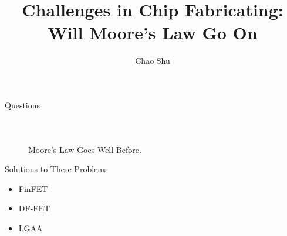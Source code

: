 \documentclass[14pt,xcolor=dvipsnames]{beamer}
\title{Challenges in Chip Fabricating:\\
	 Will Moore's Law Go On}
\author{Chao Shu\\}
\date{}
\begin{document}
\begin{frame}
\titlepage
\end{frame}

\begin{frame}{Questions}
\\
\end{frame}

\begin{frame}
\begin{columns}
	\begin{figure}[h!]
		\centering
	\end{figure}
    \pause
	\begin{figure}[h!]
		\centering
	\end{figure}
\end{columns}
\end{frame}

\begin{frame}
	\begin{figure}[h!]
	\centering
	\caption{Moore's Law Goes Well Before.}
\end{figure}
\end{frame}

\begin{frame}{Solutions to These Problems}
\begin{itemize}[<+-| alert@+>]
	\item FinFET
	\item DF-FET
	\item LGAA
\end{itemize}
\pause
\end{frame}
\end{document}

